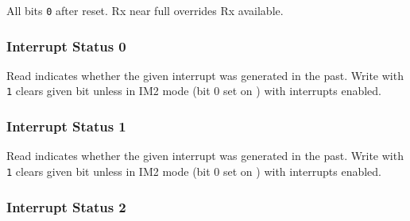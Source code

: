 All bits {\tt 0} after reset. Rx near full overrides Rx available.


\subsubsection{Interrupt Status 0 }

\begin{NextPort}
\end{NextPort}

Read indicates whether the given interrupt was generated in the past. Write with {\tt 1} clears given bit unless in IM2 mode (bit 0 set on ) with interrupts enabled.


\subsubsection{Interrupt Status 1 }

\begin{NextPort}
\end{NextPort}

Read indicates whether the given interrupt was generated in the past. Write with {\tt 1} clears given bit unless in IM2 mode (bit 0 set on ) with interrupts enabled.


\subsubsection{Interrupt Status 2 }

\begin{NextPort}
\end{NextPort}

